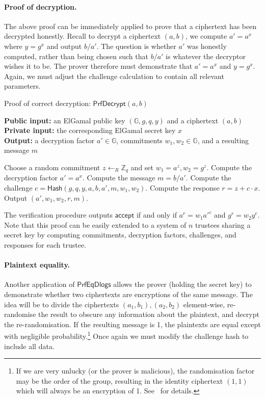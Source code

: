 \documentclass[12pt,a4paper]{article}
\theoremstyle{definition}
\begin{document}
\paragraph{Proof of decryption.}
The above proof can be immediately applied to prove that a ciphertext has been decrypted honestly. Recall to decrypt a ciphertext $(a, b)$, we compute $a' = a^x$ where $y=g^x$ and output $b/a'$. The question is whether $a'$ was honestly computed, rather than being chosen such that $b/a'$ is whatever the decryptor wishes it to be. The prover therefore must demonstrate that $a'=a^x$ and $y=g^x$. Again, we must adjust the challenge calculation to contain all relevant parameters.
\begin{algorithm}\caption{Proof of correct decryption: $\mathsf{PrfDecrypt}(a, b)$}\label{prot:ProofDecrypt}
    \textbf{Public input:} an ElGamal public key $(\mathbb{G}, g, q, y)$ and a ciphertext $(a, b)$\\
    \textbf{Private input:} the corresponding ElGamal secret key $x$\\
    \textbf{Output:} a decryption factor $a'\in\mathbb{G}$, commitments $w_1, w_2\in\mathbb{G}$, and a resulting message $m$
    \begin{algorithmic}[1]
        \State Choose a random commitment $z\leftarrow_R\mathbb{Z}_q$ and set $w_1 = a^z, w_2 = g^z$.
        \State Compute the decryption factor $a'=a^x$.
        \State Compute the message $m=b/a'$.
        \State Compute the challenge $c=\mathsf{Hash}(g, q, y, a, b, a', m, w_1, w_2)$.
        \State Compute the response $r=z+c\cdot x$.
        \State Output $(a', w_1, w_2, r, m)$.
    \end{algorithmic}
\end{algorithm}
The verification procedure outputs $\mathsf{accept}$ if and only if $a^r=w_1a'^c$ and $g^r=w_2y^c$. Note that this proof can be easily extended to a system of $n$ trustees sharing a secret key by computing commitments, decryption factors, challenges, and responses for each trustee.

\paragraph{Plaintext equality.}
Another application of $\mathsf{PrfEqDlogs}$ allows the prover (holding the secret key) to demonstrate whether two ciphertexts are encryptions of the same message. The idea will be to divide the ciphertexts $(a_1, b_1), (a_2, b_2)$ element-wise, re-randomise the result to obscure any information about the plaintext, and decrypt the re-randomisation. If the resulting message is 1, the plaintexts are equal except with negligible probability.\footnote{If we are very unlucky (or the prover is malicious), the randomisation factor may be the order of the group, resulting in the identity ciphertext $(1, 1)$ which will always be an encryption of 1. See~\cite{mcmurtry2020test} for details.} Once again we must modify the challenge hash to include all data.
\end{document}
